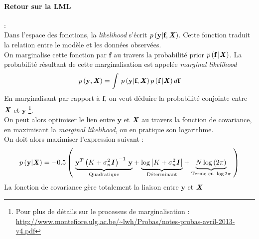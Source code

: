 \documentclass[a4paper,12pt]{report}
\newcommand{\bepar}[1]{
	\left( #1 \right)  
}
\numberwithin{equation}{section} %
\begin{document}
\paragraph*{Retour sur la LML } : \\
\noindent Dans l'espace des fonctions, la \textit{likelihood} s'écrit $\displaystyle p\bepar{\textbf{y} | \textbf{f},\textbf{\textit{X}}}$. Cette fonction traduit la relation entre le modèle et les données observées. \\
On marginalise cette fonction par $\textbf{f}$ au travers la probabilité prior $p\bepar{\textbf{f}\,|\textbf{\textit{X}}}$. La probabilité résultant de cette marginalisation est appelée \textit{marginal likelihood}
\begin{equation}
p\bepar{\textbf{y}, \textbf{\textit{X}}} = \int \, p\bepar{\textbf{y} | \textbf{f},\textbf{\textit{X}}} p\bepar{\textbf{f}\,|\textbf{\textit{X}}} d\textbf{f}
\end{equation}
En marginalisant par rapport à $\textbf{f}$, on veut déduire la probabilité conjointe entre $\textbf{\textit{X}}$ et $\textbf{y}$ \footnote{Pour plus de détails sur le processus de marginalisation : \url{http://www.montefiore.ulg.ac.be/~lwh/Probas/notes-probas-avril-2013-v4.pdf}}.\\
On peut alors optimiser le lien entre $\textbf{y}$ et $\textbf{\textit{X}}$ au travers la fonction de covariance, en maximisant la \textit{marginal likelihood}, ou en pratique son logarithme.\\
On doit alors maximiser l'expression suivant :
\begin{equation}
p\bepar{\textbf{y} | \textbf{\textit{X}}} = -0.5 \bepar{~ \underset{\text{Quadratique}}{\underbrace{\textbf{y}^T\bepar{K + \sigma_n^2\textit{\textbf{I}\,}}^{-1}\, \textbf{y}}} + \underset{\text{Déterminant}}{\underbrace{\log \left | K + \sigma_n^2\textbf{\textit{I}}\right |}} + \underset{\text{Terme en }\log{2\pi}}{\underbrace{N \log\bepar{2\pi}}}~ }
\end{equation}  
La fonction de covariance gère totalement la liaison entre $\textbf{y}$ et $\textbf{\textit{X}}$
\newpage
\end{document}
